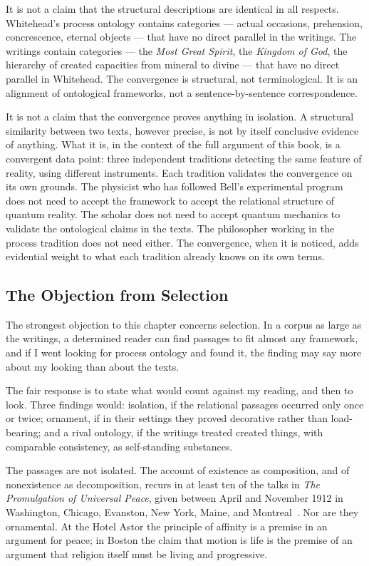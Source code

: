 It is not a claim that the structural descriptions are identical in all respects.
Whitehead's process ontology contains categories --- actual occasions, prehension,
concrescence, eternal objects --- that have no direct parallel in the \bahai
writings.
The \bahai writings contain categories --- the \emph{Most Great Spirit}, the
\emph{Kingdom of God}, the hierarchy of created capacities from mineral to divine
--- that have no direct parallel in Whitehead.
The convergence is structural, not terminological.
It is an alignment of ontological frameworks, not a sentence-by-sentence
correspondence.

It is not a claim that the convergence proves anything in isolation.
A structural similarity between two texts, however precise, is not by itself
conclusive evidence of anything.
What it is, in the context of the full argument of this book, is a convergent
data point: three independent traditions detecting the same feature of reality,
using different instruments.
Each tradition validates the convergence on its own grounds.
The physicist who has followed Bell's experimental program does not need to accept
the \bahai framework to accept the relational structure of quantum reality.
The \bahai scholar does not need to accept quantum mechanics to validate the
ontological claims in the texts.
The philosopher working in the process tradition does not need either.
The convergence, when it is noticed, adds evidential weight to what each tradition
already knows on its own terms.

\subsection*{The Objection from Selection}

The strongest objection to this chapter concerns selection.
In a corpus as large as the \bahai writings, a determined reader can find
passages to fit almost any framework, and if I went looking for process ontology
and found it, the finding may say more about my looking than about the texts.

The fair response is to state what would count against my reading, and then to
look.
Three findings would: isolation, if the relational passages occurred only once or
twice; ornament, if in their settings they proved decorative rather than
load-bearing; and a rival ontology, if the writings treated created things, with
comparable consistency, as self-standing substances.

The passages are not isolated.
The account of existence as composition, and of nonexistence as decomposition,
recurs in at least ten of the talks in \textit{The Promulgation of Universal
Peace}, given between April and November 1912 in Washington, Chicago, Evanston,
New York, Maine, and
Montreal~\citep[Talks 23, 38, 41, 48, 74, 89, 92, 100, 123, 125]{PUP}.
Nor are they ornamental.
At the Hotel Astor the principle of affinity is a premise in an argument for
peace; in Boston the claim that motion is life is the premise of an argument that
religion itself must be living and progressive.

